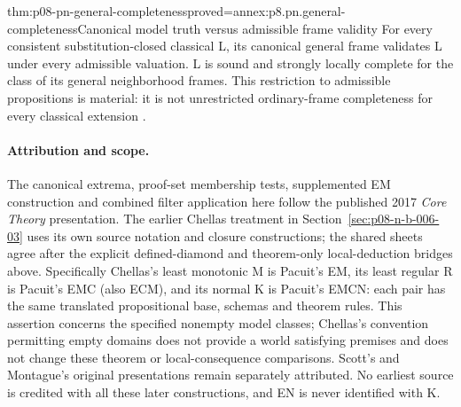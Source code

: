 \begin{hbtheorem}{thm:p08-pn-general-completeness}{proved=annex:p8.pn.general-completeness}{Canonical model truth versus admissible frame validity}
For every consistent substitution-closed classical L, its
canonical general frame validates L under every admissible
valuation. L is sound and strongly locally complete for the
class of its general neighborhood frames. This restriction
to admissible propositions is material: it is not unrestricted
ordinary-frame completeness for every classical extension
\cite[thm.~2.45, cor.~2.3]{Pacuit2017}.
\end{hbtheorem}

\paragraph{Attribution and scope.}
The canonical extrema, proof-set membership tests, supplemented EM
construction and combined filter application here follow the published
2017 \emph{Core Theory} presentation. The earlier Chellas treatment in
Section~\ref{sec:p08-n-b-006-03} uses its own source notation and
closure constructions; the shared sheets agree after the explicit
defined-diamond and theorem-only local-deduction bridges above.
Specifically Chellas's least monotonic M is Pacuit's EM, its
least regular R is Pacuit's EMC (also ECM), and its normal K is
Pacuit's EMCN: each pair has the same translated propositional
base, schemas and theorem rules. This assertion concerns the
specified nonempty model classes; Chellas's convention permitting
empty domains does not provide a world satisfying premises and
does not change these theorem or local-consequence comparisons.
Scott's and Montague's original presentations remain separately
attributed. No earliest source is credited with all these later
constructions, and EN is never identified with K.
